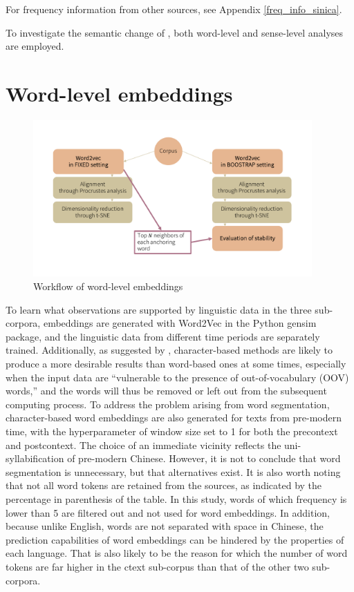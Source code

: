For frequency information from other sources, see Appendix \ref{freq_info_sinica}.

To investigate the semantic change of \jia\rspace, both word-level and sense-level analyses are employed.

\section{Word-level embeddings}

\begin{figure}[H]
  \centering
  \includegraphics[height=0.4\textheight,width=0.95\textwidth,keepaspectratio]{figures_new/from_slides/workflow_word_level.pdf}
  \caption{Workflow of word-level embeddings}
  \label{fig:workflow_word_level}
\end{figure}

To learn what observations are supported by linguistic data in the three sub-corpora, embeddings are generated with Word2Vec in the Python gensim package, and the linguistic data from different time periods are separately trained. Additionally, as suggested by \textcite{li2019word}, character-based methods are likely to produce a more desirable results than word-based ones at some times, especially when the input data are ``vulnerable to the presence of out-of-vocabulary (OOV) words,'' and the words will thus be removed or left out from the subsequent computing process. To address the problem arising from word segmentation, character-based word embeddings are also generated for texts from pre-modern time, with the hyperparameter of window size set to 1 for both the precontext and postcontext. The choice of an immediate vicinity reflects the uni-syllabification of pre-modern Chinese. However, it is not to conclude that word segmentation is unnecessary, but that alternatives exist.  It is also worth noting that not all word tokens are retained from the sources, as indicated by the percentage in parenthesis of the table. In this study, words of which frequency is lower than 5 are filtered out and not used for word embeddings. In addition, because unlike English, words are not separated with space in Chinese, the prediction capabilities of word embeddings can be hindered by the properties of each language. That is also likely to be the reason for which the number of word tokens are far higher in the \gls{ctext} sub-corpus than that of the other two sub-corpora.


